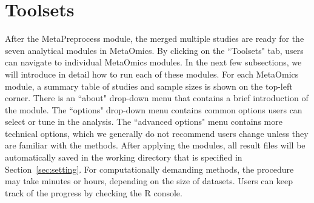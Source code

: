 \section{Toolsets}

After the MetaPreprocess module, 
the merged multiple studies are ready for the seven analytical modules in MetaOmics.
By clicking on the ``Toolsets" tab, users can navigate to individual MetaOmics modules.
In the next few subsections, 
we will introduce in detail how to run each of these modules.
For each MetaOmics module, 
a summary table of studies and sample sizes is shown on the top-left corner. 
There is an ``about" drop-down menu that contains a brief introduction  of the module.
The ``options" drop-down menu contains common options users can select or tune in the analysis.
The ``advanced options" menu contains more technical options, 
which we generally do not recommend users change unless they are familiar with the methods.
After applying the modules, 
all result files will be automatically saved in the working directory that is specified in Section~\ref{sec:setting}.
For computationally demanding methods, the procedure may take minutes or  hours, depending on the size of datasets.
Users can keep track of the progress by checking the R console.






